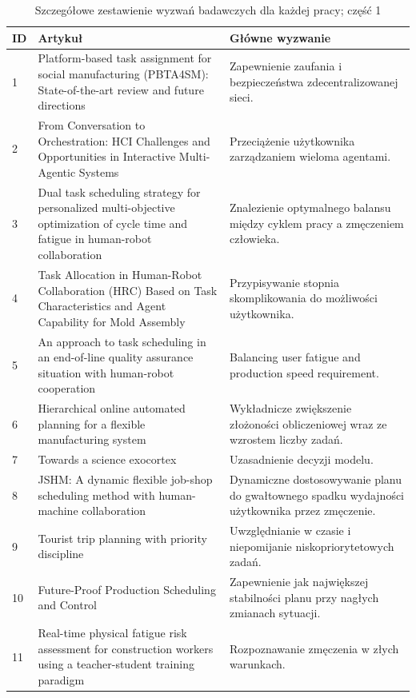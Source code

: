 \begin{table}[htbp!]
\caption{Szczegółowe zestawienie wyzwań badawczych dla każdej pracy; część 1}
\label{tab:challenges_summary}
\begin{tabular}{p{0.5cm} p{8cm}|p{6.3cm}}
\hline
\textbf{ID} & \textbf{Artykuł} & \textbf{Główne wyzwanie} \\ \hline
1 & Platform-based task assignment for social manufacturing (PBTA4SM): State-of-the-art review and future directions & Zapewnienie zaufania i bezpieczeństwa zdecentralizowanej sieci. \\ \hline
2 & From Conversation to Orchestration: HCI Challenges and Opportunities in Interactive Multi-Agentic Systems & Przeciążenie użytkownika zarządzaniem wieloma agentami. \\ \hline
3 & Dual task scheduling strategy for personalized multi-objective optimization of cycle time and fatigue in human-robot collaboration & Znalezienie optymalnego balansu między cyklem pracy a zmęczeniem człowieka. \\ \hline
4 & Task Allocation in Human-Robot Collaboration (HRC) Based on Task Characteristics and Agent Capability for Mold Assembly & Przypisywanie stopnia skomplikowania do możliwości użytkownika. \\ \hline
5 & An approach to task scheduling in an end-of-line quality assurance situation with human-robot cooperation & Balancing user fatigue and production speed requirement. \\ \hline
6 & Hierarchical online automated planning for a flexible manufacturing system & Wykładnicze zwiększenie złożoności obliczeniowej wraz ze wzrostem liczby zadań. \\ \hline
7 & Towards a science exocortex & Uzasadnienie decyzji modelu. \\ \hline
8 & JSHM: A dynamic flexible job-shop scheduling method with human-machine collaboration & Dynamiczne dostosowywanie planu do gwałtownego spadku wydajności użytkownika przez zmęczenie. \\ \hline
9 & Tourist trip planning with priority discipline & Uwzględnianie w czasie i niepomijanie niskopriorytetowych zadań. \\ \hline
10 & Future-Proof Production Scheduling and Control & Zapewnienie jak największej stabilności planu przy nagłych zmianach sytuacji. \\ \hline
11 & Real-time physical fatigue risk assessment for construction workers using a teacher-student training paradigm & Rozpoznawanie zmęczenia w złych warunkach. \\ \hline
\end{tabular}
\end{table}

